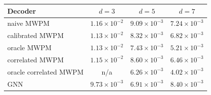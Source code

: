 \begin{tabular}{lccc}
\toprule
Decoder & $d=3$ & $d=5$ & $d=7$ \\
\midrule
naive MWPM & $1.16\times10^{-2}$ & $9.09\times10^{-3}$ & $7.24\times10^{-3}$ \\
calibrated MWPM & $1.13\times10^{-2}$ & $8.32\times10^{-3}$ & $6.82\times10^{-3}$ \\
oracle MWPM & $1.13\times10^{-2}$ & $7.43\times10^{-3}$ & $5.21\times10^{-3}$ \\
correlated MWPM & $1.15\times10^{-2}$ & $8.60\times10^{-3}$ & $6.46\times10^{-3}$ \\
oracle correlated MWPM & n/a & $6.26\times10^{-3}$ & $4.02\times10^{-3}$ \\
GNN & $9.73\times10^{-3}$ & $6.91\times10^{-3}$ & $8.40\times10^{-3}$ \\
\bottomrule
\end{tabular}
